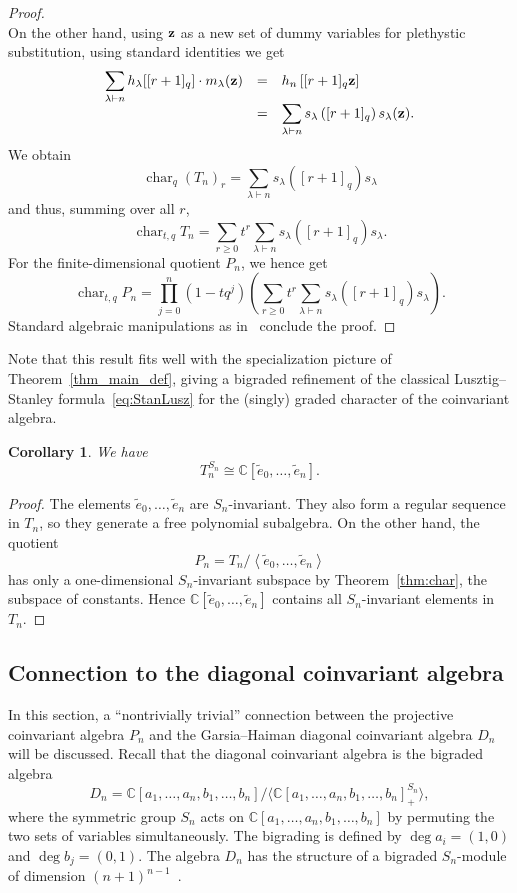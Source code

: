 \documentclass[a4paper,11pt]{amsart}
\theoremstyle{plain}
\newtheorem{corollary}[theorem]{Corollary}
\theoremstyle{definition}
\newcommand{\C}{\mathbb{C}}
\newcommand{\pa}{T} %
\newcommand{\te}{\widetilde{e}}
\DeclareMathOperator{\cha}{char}
\begin{document}
\begin{proof}
\[\]
On the other hand, using ${\bf z}$ as a new set of dummy variables for plethystic substitution, using standard identities we get
\[ \begin{array}{rcl}
\displaystyle\sum_{\lambda\vdash n} h_\lambda[[r+1]_q] \cdot m_\lambda({\bf z})  & = & h_n\left[ [r+1]_q {\bf z} \right]\\
& = & \displaystyle\sum_{\lambda\vdash n}s_\lambda \left([r+1]_q \right) s_\lambda({\bf z}). 
\end{array}\]
We obtain
\[\cha_{q} (T_n)_r =  \sum_{\lambda\vdash n}s_\lambda([r+1]_q)s_\lambda\]
and thus, summing over all $r$,
\[\cha_{t,q} T_n =  \sum_{r\geq 0} t^r \sum_{\lambda\vdash n}s_\lambda([r+1]_q)s_\lambda. \]
For the finite-dimensional quotient $P_n$, we hence get 
\[\cha_{t,q} P_n = \prod_{j=0}^n(1-t q^j)\left(\sum_{r\geq 0} t^r \sum_{\lambda\vdash n}s_\lambda([r+1]_q)s_\lambda \right). 
\] 
Standard algebraic manipulations as in~\cite[Proof of Prop.3.14]{RSW} conclude the proof. 
\end{proof}
Note that this result fits well with the specialization picture of Theorem~\ref{thm_main_def}, giving a bigraded refinement of the classical Lusztig--Stanley formula~\eqref{eq:StanLusz} for the (singly) graded character of the coinvariant algebra. 

\begin{corollary}\label{cor:Pn} We have \[\pa_n^{S_n} \cong \C[\te_0, \ldots, \te_n].\]
\end{corollary}
\begin{proof} The elements $\te_0, \ldots, \te_n$ are $S_n$-invariant. They also form a regular 
sequence in $\pa_n$, so they generate a free polynomial subalgebra. On the other hand, 
the quotient 
\[P_n = \pa_n / \left\langle \te_0, \ldots, \te_n\right\rangle\]
has only a one-dimensional $S_n$-invariant subspace by Theorem~\ref{thm:char}, the subspace of constants. Hence $\C[\te_0, \ldots, \te_n]$ contains all $S_n$-invariant elements in $\pa_n$. 
\end{proof}

\subsection{Connection to the diagonal coinvariant algebra}
In this section, a ``nontrivially trivial'' connection between the projective coinvariant algebra $P_n$ and the Garsia--Haiman diagonal coinvariant algebra $D_n$ will be discussed. Recall that the diagonal coinvariant algebra is the bigraded algebra
\[ D_n = \C[a_1, \ldots, a_n, b_1, \ldots, b_n] /\langle \C[a_1, \ldots, a_n, b_1, \ldots, b_n]^{S_n}_+\rangle, 
\]
where the symmetric group $S_n$ acts on $\C[a_1, \ldots, a_n, b_1, \ldots, b_n]$ by permuting the two sets of variables simultaneously. The bigrading is defined by $\deg a_i=(1,0)$ and $\deg b_j=(0,1)$. The algebra $D_n$ has the structure of a bigraded $S_n$-module of dimension $(n+1)^{n-1}$~\cite{H}. 
\end{document}
